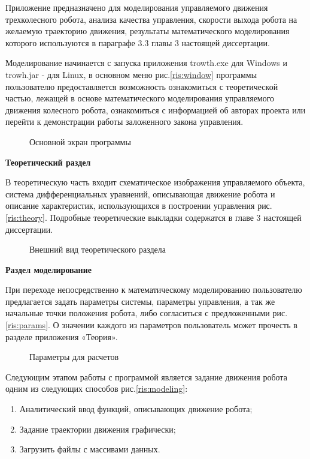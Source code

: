 Приложение предназначено для моделирования управляемого движения трехколесного робота, анализа качества управления, скорости выхода робота на желаемую траекторию движения, результаты математического моделирования которого используются в параграфе 3.3 главы 3 настоящей диссертации.

Моделирование начинается с запуска приложения trowth.exe для Windows и trowh.jar - для Linux, в основном меню рис.\eqref{ris:window} программы пользователю предоставляется возможность ознакомиться с теоретической частью, лежащей в основе математического моделирования управляемого движения колесного робота, ознакомиться с информацией об авторах проекта или перейти к демонстрации работы заложенного закона управления. 

\begin{figure}[h]
\caption{Основной экран программы}
\label{ris:window}
\end{figure}

\par
\textbf{Теоретический раздел}

В теоретическую часть входит схематическое изображения управляемого объекта, система дифференциальных уравнений, описывающая движение робота и описание характеристик, использующихся в построении управления рис.\eqref{ris:theory}. 
Подробные теоретические выкладки содержатся в главе 3 настоящей  диссертации.
\nopagebreak[4]
\begin{figure}[h]
\caption{Внешний вид теоретического раздела}
\label{ris:theory}
\end{figure} 

\par
\textbf{Раздел моделирование}

При переходе непосредственно к математическому моделированию пользователю предлагается задать параметры системы, параметры управления, а так же начальные точки положения робота, либо согласиться с предложенными рис.\eqref{ris:params}. О значении каждого из параметров пользователь может прочесть в разделе приложения «Теория».

\begin{figure}[h]
\caption{Параметры для расчетов}
\label{ris:params}
\end{figure} 

Следующим этапом работы с программой является задание движения робота одним из следующих способов рис.\eqref{ris:modeling}:
\begin{enumerate}
\item{Аналитический ввод функций, описывающих движение робота;}
\item{Задание траектории движения графически;}
\item{Загрузить файлы с массивами данных.}
\end{enumerate}

